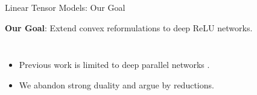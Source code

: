 \documentclass[usenames,dvipsnames,notheorems]{beamer}
\newcommand{\bad}[1]{\textcolor{bad}{#1}}
\newcommand{\good}[1]{\textcolor{good}{#1}}
\begin{document}
\begin{frame}{Linear Tensor Models: Our Goal}

	\textbf{Our Goal}: Extend convex reformulations to \good{deep ReLU
		networks}.

	\pause
	\vspace{1ex}
	\begin{columns}
		\begin{itemize}
			\item<2-> Previous work is limited to \bad{deep parallel
				      networks} \citep{ergen2021global, wang2023parallel}.
			      \vspace{1ex}

			\item<3-> We abandon strong duality and argue by \good{reductions}.
		\end{itemize}
		\begin{center}
			
		\end{center}
	\end{columns}


\end{frame}
\end{document}

